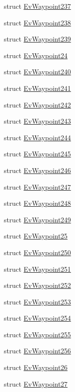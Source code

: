 \begin{DoxyCompactItemize}
struct \hyperlink{structsmacc_1_1EvWaypoint237}{Ev\+Waypoint237}
\item 
struct \hyperlink{structsmacc_1_1EvWaypoint238}{Ev\+Waypoint238}
\item 
struct \hyperlink{structsmacc_1_1EvWaypoint239}{Ev\+Waypoint239}
\item 
struct \hyperlink{structsmacc_1_1EvWaypoint24}{Ev\+Waypoint24}
\item 
struct \hyperlink{structsmacc_1_1EvWaypoint240}{Ev\+Waypoint240}
\item 
struct \hyperlink{structsmacc_1_1EvWaypoint241}{Ev\+Waypoint241}
\item 
struct \hyperlink{structsmacc_1_1EvWaypoint242}{Ev\+Waypoint242}
\item 
struct \hyperlink{structsmacc_1_1EvWaypoint243}{Ev\+Waypoint243}
\item 
struct \hyperlink{structsmacc_1_1EvWaypoint244}{Ev\+Waypoint244}
\item 
struct \hyperlink{structsmacc_1_1EvWaypoint245}{Ev\+Waypoint245}
\item 
struct \hyperlink{structsmacc_1_1EvWaypoint246}{Ev\+Waypoint246}
\item 
struct \hyperlink{structsmacc_1_1EvWaypoint247}{Ev\+Waypoint247}
\item 
struct \hyperlink{structsmacc_1_1EvWaypoint248}{Ev\+Waypoint248}
\item 
struct \hyperlink{structsmacc_1_1EvWaypoint249}{Ev\+Waypoint249}
\item 
struct \hyperlink{structsmacc_1_1EvWaypoint25}{Ev\+Waypoint25}
\item 
struct \hyperlink{structsmacc_1_1EvWaypoint250}{Ev\+Waypoint250}
\item 
struct \hyperlink{structsmacc_1_1EvWaypoint251}{Ev\+Waypoint251}
\item 
struct \hyperlink{structsmacc_1_1EvWaypoint252}{Ev\+Waypoint252}
\item 
struct \hyperlink{structsmacc_1_1EvWaypoint253}{Ev\+Waypoint253}
\item 
struct \hyperlink{structsmacc_1_1EvWaypoint254}{Ev\+Waypoint254}
\item 
struct \hyperlink{structsmacc_1_1EvWaypoint255}{Ev\+Waypoint255}
\item 
struct \hyperlink{structsmacc_1_1EvWaypoint256}{Ev\+Waypoint256}
\item 
struct \hyperlink{structsmacc_1_1EvWaypoint26}{Ev\+Waypoint26}
\item 
struct \hyperlink{structsmacc_1_1EvWaypoint27}{Ev\+Waypoint27}

\end{DoxyCompactItemize}

